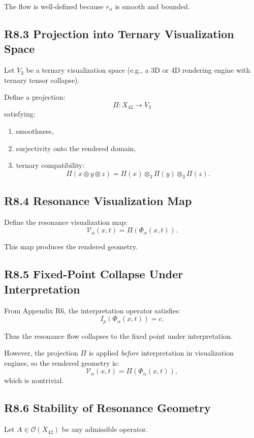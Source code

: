 The flow is well-defined because $r_{\alpha}$ is smooth and bounded.

\subsection*{R8.3 Projection into Ternary Visualization Space}

Let $V_3$ be a ternary visualization space (e.g., a 3D or 4D rendering
engine with ternary tensor collapse).

Define a projection:
\[
\Pi : X_{42} \to V_3
\]
satisfying:

\begin{enumerate}
    \item smoothness,
    \item surjectivity onto the rendered domain,
    \item ternary compatibility:
    \[
    \Pi(x \otimes y \otimes z) = \Pi(x) \otimes_3 \Pi(y) \otimes_3 \Pi(z).
    \]
\end{enumerate}

\subsection*{R8.4 Resonance Visualization Map}

Define the resonance visualization map:
\[
\mathcal{V}_{\alpha}(x,t) = \Pi(\Phi_{\alpha}(x,t)).
\]

This map produces the rendered geometry.

\subsection*{R8.5 Fixed-Point Collapse Under Interpretation}

From Appendix R6, the interpretation operator satisfies:
\[
I_p(\Phi_{\alpha}(x,t)) = c.
\]

Thus the resonance flow collapses to the fixed point under interpretation.

However, the projection $\Pi$ is applied \emph{before} interpretation in
visualization engines, so the rendered geometry is:
\[
\mathcal{V}_{\alpha}(x,t) = \Pi(\Phi_{\alpha}(x,t)),
\]
which is nontrivial.

\subsection*{R8.6 Stability of Resonance Geometry}

Let $A \in \mathcal{O}(X_{42})$ be any admissible operator.

